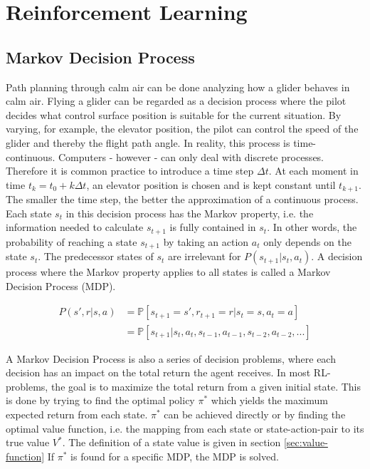 \chapter{Reinforcement Learning}

\section{Markov Decision Process}

Path planning through calm air can be done analyzing how a glider behaves in calm air. Flying a glider can be regarded as a decision process where the pilot decides what control surface position is suitable for the current situation. By varying, for example, the elevator position, the pilot can control the speed of the glider and thereby the flight path angle. In reality, this process is time-continuous. Computers - however - can only deal with discrete processes. Therefore it is common practice to introduce a time step $\Delta t$. At each moment in time $t_k = t_0 + k\Delta t$, an elevator position is chosen and is kept constant until $t_{k+1}$. The smaller the time step, the better the approximation of a continuous process. Each state $s_t$ in this decision process has the Markov property, i.e. the information needed to calculate $s_{t+1}$ is fully contained in $s_t$. In other words, the probability of reaching a state $s_{t+1}$ by taking an action $a_t$ only depends on the state $s_t$. The predecessor states of $s_t$ are irrelevant for $P(s_{t+1}|s_t,a_t)$. A decision process where the Markov property applies to all states is called a Markov Decision Process (MDP). 

\begin{align}
P(s',r|s,a)&=\mathbb{P}[s_{t+1}=s',r_{t+1}=r|s_t=s,a_t=a] \\
&= \mathbb{P}[s_{t+1}|s_t,a_t,s_{t-1},a_{t-1},s_{t-2},a_{t-2},...]
\end{align}

A Markov Decision Process is also a series of decision problems, where each decision has an impact on the total return the agent receives. In most RL-problems, the goal is to maximize the total return from a given initial state. This is done by trying to find the optimal policy $\pi^*$ which yields the maximum expected return from each state. $\pi^*$ can be achieved directly or by finding the optimal value function, i.e. the mapping from each state or state-action-pair to its true value $V^*$. The definition of a state value is given in section \ref{sec:value-function} If $\pi^*$ is found for a specific MDP, the MDP is solved.

